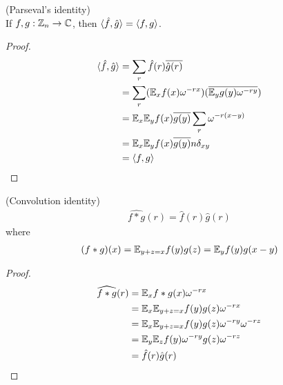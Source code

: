 \documentclass[a4paper]{article}
\begin{document}
\begin{lemma} (Parseval's identity)\\
    If $f,g: \mathbb{Z}_n \to \mathbb{C}$, then $\langle \hat{f},\hat{g}\rangle = \langle f,g\rangle$.
    \begin{proof}
        \begin{equation*}
            \begin{aligned}
                \langle\hat{f},\hat{g}\rangle &= \sum_r \hat{f}(r) \overline{\hat{g}(r)}\\
                &= \sum_r (\mathbb{E}_x f(x) \omega^{-rx}) (\overline{\mathbb{E}_y g(y) \omega^{-ry}})\\
                &= \mathbb{E}_x \mathbb{E}_y f(x) \overline{g(y)} \sum_r \omega^{-r(x-y)}\\
                &= \mathbb{E}_x \mathbb{E}_y f(x) \overline{g(y)} n\delta_{xy}\\
                &= \langle f,g\rangle
            \end{aligned}
            \end{equation*}
    \end{proof}
\end{lemma}

\begin{lemma} (Convolution identity)\\
    \begin{equation*}
        \begin{aligned}
            \widehat{f*g}(r) = \hat{f}(r)\hat{g}(r)
        \end{aligned}
    \end{equation*}
    where
    \begin{equation*}
        \begin{aligned}
            (f*g)(x) = \mathbb{E}_{y+z=x}f(y)g(z) = \mathbb{E}_y f(y)g(x-y)
        \end{aligned}
    \end{equation*}
    \begin{proof}
        \begin{equation*}
            \begin{aligned}
                \widehat{f*g}(r) &= \mathbb{E}_x f*g(x)\omega^{-rx}\\
                &=\mathbb{E}_x \mathbb{E}_{y+z=x}f(y)g(z)\omega^{-rx}\\
                &=\mathbb{E}_x\mathbb{E}_{y+z=x} f(y)g(z) \omega^{-ry}\omega^{-rz}\\
                &=\mathbb{E}_y\mathbb{E}_z f(y) \omega^{-ry} g(z) \omega^{-rz}\\
                &=\hat{f}(r) \hat{g}(r)
            \end{aligned}
        \end{equation*}
    \end{proof}

\end{lemma}
\end{document}
